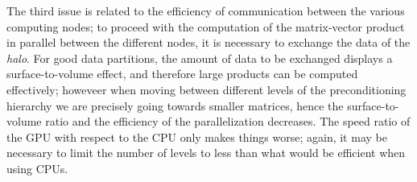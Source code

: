 The third issue is related to the efficiency of communication between
the various computing nodes; to proceed with the computation of the
matrix-vector product in parallel between the different nodes, it is
necessary to exchange the data of the \emph{halo}. For good data
partitions, the amount of data to be exchanged displays a
surface-to-volume effect, and therefore large products can be computed
effectively; howeveer when moving between different levels of the
preconditioning hierarchy we are precisely going towards smaller
matrices, hence the surface-to-volume ratio and the efficiency of the
parallelization decreases. The speed ratio of the GPU with respect to
the CPU only makes things worse; again, it may be necessary to limit
the number of levels to less than what would be efficient when using
CPUs. 

